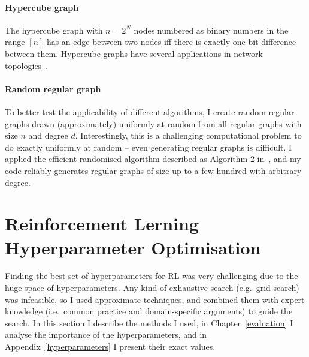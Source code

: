 \paragraph{Hypercube graph} The hypercube graph with $n=2^N$ nodes numbered as binary numbers in the range $[n]$ has an edge between two nodes iff there is exactly one bit difference between them. Hypercube graphs have several applications in network topologies~\cite{ostrouchov1987hypercubenetwork}.


\paragraph{Random regular graph} To better test the applicability of different algorithms, I create random regular graphs drawn (approximately) uniformly at random from all regular graphs with size $n$ and degree $d$. Interestingly, this is a challenging computational problem to do exactly uniformly at random -- even generating regular graphs is difficult. I applied the efficient randomised algorithm described as Algorithm 2 in~\cite{steger1999randomregulargraphs}, and my code reliably generates regular graphs of size up to a few hundred with arbitrary degree.


\section{Reinforcement Lerning Hyperparameter Optimisation}

Finding the best set of hyperparameters for RL was very challenging due to the huge space of hyperparameters. Any kind of exhaustive search (e.g.\ grid search) was infeasible, so I used approximate techniques, and combined them with expert knowledge (i.e.\ common practice and domain-specific arguments) to guide the search.
In this section I describe the methods I used, in Chapter~\ref{evaluation} I analyse the importance of the hyperparameters, and in Appendix~\ref{hyperparameters} I present their exact values.


